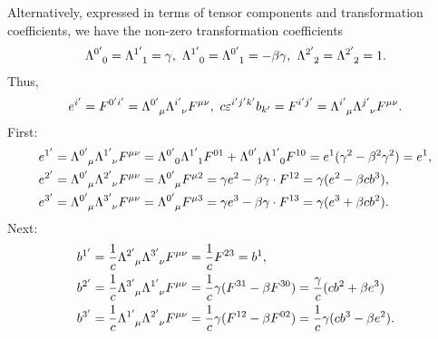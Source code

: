 Alternatively, expressed in terms of tensor components and transformation coefficients, we have the non-zero transformation coefficients
\begin{align*}
	\trcou{0\p}{0} = \trcou{1\p}{1} = \gamma,\ \trcou{1\p}{0} = \trcou{0\p}{1} = -\beta\gamma,\ \trcou{2\p}{2} = \trcou{2\p}{2} = 1.
\end{align*}
Thus,
\begin{align*}
	e^{i\p} = F^{0\p i\p} = \trcou{0\p}{\mu}\trcou{i\p}{\nu}F^{\mu\nu},\ c\varepsilon^{i\p j\p k\p}b_{k\p} = F^{i\p j\p} = \trcou{i\p}{\mu}\trcou{j\p}{\nu}F^{\mu\nu}.
\end{align*}
First:
\begin{align*}
	e^{1\p} &= \trcou{0\p}{\mu}\trcou{1\p}{\nu}F^{\mu\nu} = \trcou{0\p}{0}\trcou{1\p}{1}F^{01} + \trcou{0\p}{1}\trcou{1\p}{0}F^{10} = e^{1}(\gamma^{2} - \beta^{2}\gamma^{2}) = e^{1}, \\
	e^{2\p} &= \trcou{0\p}{\mu}\trcou{2\p}{\nu}F^{\mu\nu} = \trcou{0\p}{\mu}F^{\mu 2} = \gamma e^{2} - \beta\gamma\cdot F^{12} = \gamma(e^{2} - \beta cb^{3}), \\
	e^{3\p} &= \trcou{0\p}{\mu}\trcou{3\p}{\nu}F^{\mu\nu} = \trcou{0\p}{\mu}F^{\mu 3} = \gamma e^{3} - \beta\gamma\cdot F^{13} = \gamma(e^{3} + \beta cb^{2}).
\end{align*}
Next:
\begin{align*}
	b^{1\p} &= \frac{1}{c}\trcou{2\p}{\mu}\trcou{3\p}{\nu}F^{\mu\nu} = \frac{1}{c}F^{23} = b^{1}, \\
	b^{2\p} &= \frac{1}{c}\trcou{3\p}{\mu}\trcou{1\p}{\nu}F^{\mu\nu} = \frac{1}{c}\gamma(F^{31} - \beta F^{30}) = \frac{\gamma}{c}(cb^{2} + \beta e^{3}) \\
	b^{3\p} &= \frac{1}{c}\trcou{1\p}{\mu}\trcou{2\p}{\nu}F^{\mu\nu} = \frac{1}{c}\gamma(F^{12} - \beta F^{02}) = \frac{1}{c}\gamma(cb^{3} - \beta e^{2}).
\end{align*}

